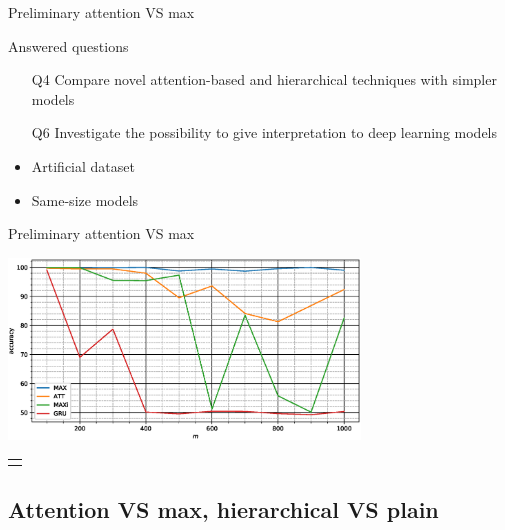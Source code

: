 \begin{frame}{Preliminary attention VS max}
  \begin{block}{Answered questions}
  \begin{itemize}
  \item[Q4] \alert{Compare} novel \alert{attention}-based and
    \alert{hierarchical} techniques with simpler models
  \item[Q6] \alert{Investigate} the possibility to give
    \alert{interpretation} to deep learning models
  \end{itemize}
\end{block}
\begin{itemize}
\item \alert{Artificial} dataset
\item \alert{Same-size} models
\end{itemize}
\end{frame}

\begin{frame}{Preliminary attention VS max}
  \begin{center}
  \includegraphics[width=0.7\textwidth]{imgMax/maxBaseDiff.eps}    
  \footnotesize
  \begin{tabular}{|p{\floatwidth}|}
    \hline
    \\
    \hline
    \\
    \hline
  \end{tabular}
\end{center}
\end{frame}


\subsection{Attention VS max, hierarchical VS plain}

